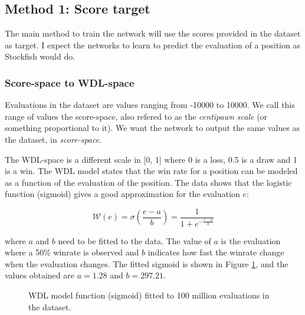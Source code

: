 

\subsection{Method 1: Score target}

The main method to train the network will use the scores provided in the dataset as target. I expect the networks to learn to predict the evaluation of a position as Stockfish would do.

\setcounter{secnumdepth}{4}
\subsubsection{Score-space to WDL-space}

Evaluations in the dataset are values ranging from -10000 to 10000. We call this range of values the score-space, also refered to as the \textit{centipawn scale} (or something proportional to it). We want the network to output the same values as the dataset, in \textit{score-space}.

The WDL-space is a different scale in [0, 1] where 0 is a loss, 0.5 is a draw and 1 is a win. The WDL model \cite{wdl-model} states that the win rate for a position can be modeled as a function of the evaluation of the position. The data shows that the logistic function (sigmoid) gives a good approximation for the evaluation $e$:

\[
\mathcal{W}(e) = \sigma\left(\frac{e-a}{b}\right) = \frac{1}{1 + e^{-\frac{e-a}{b}}}
\]

where $a$ and $b$ need to be fitted to the data. The value of $a$ is the evaluation where a 50\% winrate is observed and $b$ indicates how fast the winrate change when the evaluation changes. The fitted sigmoid is shown in Figure \ref{wdl-fit}, and the values obtained are $a=1.28$ and $b=297.21$.

\begin{figure}[H]
\centering
{}
\caption{WDL model function (sigmoid) fitted to 100 million evaluations in the dataset.}
\label{wdl-fit}
\end{figure}


